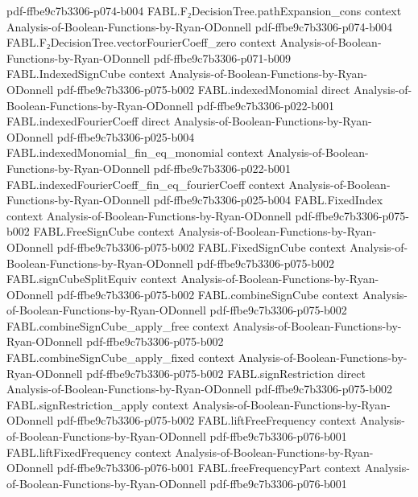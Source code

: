 \begin{theorem}
  {pdf-ffbe9c7b3306-p074-b004}
\proofstep
  {FABL.F₂DecisionTree.pathExpansion_cons}
  {context}
  {Analysis-of-Boolean-Functions-by-Ryan-ODonnell}
  {pdf-ffbe9c7b3306-p074-b004}
\proofstep
  {FABL.F₂DecisionTree.vectorFourierCoeff_zero}
  {context}
  {Analysis-of-Boolean-Functions-by-Ryan-ODonnell}
  {pdf-ffbe9c7b3306-p071-b009}
\proofstep
  {FABL.IndexedSignCube}
  {context}
  {Analysis-of-Boolean-Functions-by-Ryan-ODonnell}
  {pdf-ffbe9c7b3306-p075-b002}
\proofstep
  {FABL.indexedMonomial}
  {direct}
  {Analysis-of-Boolean-Functions-by-Ryan-ODonnell}
  {pdf-ffbe9c7b3306-p022-b001}
\proofstep
  {FABL.indexedFourierCoeff}
  {direct}
  {Analysis-of-Boolean-Functions-by-Ryan-ODonnell}
  {pdf-ffbe9c7b3306-p025-b004}
\proofstep
  {FABL.indexedMonomial_fin_eq_monomial}
  {context}
  {Analysis-of-Boolean-Functions-by-Ryan-ODonnell}
  {pdf-ffbe9c7b3306-p022-b001}
\proofstep
  {FABL.indexedFourierCoeff_fin_eq_fourierCoeff}
  {context}
  {Analysis-of-Boolean-Functions-by-Ryan-ODonnell}
  {pdf-ffbe9c7b3306-p025-b004}
\proofstep
  {FABL.FixedIndex}
  {context}
  {Analysis-of-Boolean-Functions-by-Ryan-ODonnell}
  {pdf-ffbe9c7b3306-p075-b002}
\proofstep
  {FABL.FreeSignCube}
  {context}
  {Analysis-of-Boolean-Functions-by-Ryan-ODonnell}
  {pdf-ffbe9c7b3306-p075-b002}
\proofstep
  {FABL.FixedSignCube}
  {context}
  {Analysis-of-Boolean-Functions-by-Ryan-ODonnell}
  {pdf-ffbe9c7b3306-p075-b002}
\proofstep
  {FABL.signCubeSplitEquiv}
  {context}
  {Analysis-of-Boolean-Functions-by-Ryan-ODonnell}
  {pdf-ffbe9c7b3306-p075-b002}
\proofstep
  {FABL.combineSignCube}
  {context}
  {Analysis-of-Boolean-Functions-by-Ryan-ODonnell}
  {pdf-ffbe9c7b3306-p075-b002}
\proofstep
  {FABL.combineSignCube_apply_free}
  {context}
  {Analysis-of-Boolean-Functions-by-Ryan-ODonnell}
  {pdf-ffbe9c7b3306-p075-b002}
\proofstep
  {FABL.combineSignCube_apply_fixed}
  {context}
  {Analysis-of-Boolean-Functions-by-Ryan-ODonnell}
  {pdf-ffbe9c7b3306-p075-b002}
\proofstep
  {FABL.signRestriction}
  {direct}
  {Analysis-of-Boolean-Functions-by-Ryan-ODonnell}
  {pdf-ffbe9c7b3306-p075-b002}
\proofstep
  {FABL.signRestriction_apply}
  {context}
  {Analysis-of-Boolean-Functions-by-Ryan-ODonnell}
  {pdf-ffbe9c7b3306-p075-b002}
\proofstep
  {FABL.liftFreeFrequency}
  {context}
  {Analysis-of-Boolean-Functions-by-Ryan-ODonnell}
  {pdf-ffbe9c7b3306-p076-b001}
\proofstep
  {FABL.liftFixedFrequency}
  {context}
  {Analysis-of-Boolean-Functions-by-Ryan-ODonnell}
  {pdf-ffbe9c7b3306-p076-b001}
\proofstep
  {FABL.freeFrequencyPart}
  {context}
  {Analysis-of-Boolean-Functions-by-Ryan-ODonnell}
  {pdf-ffbe9c7b3306-p076-b001}

\end{theorem}
